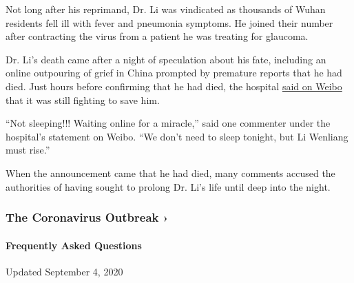 Not long after his reprimand, Dr. Li was vindicated as thousands of
Wuhan residents fell ill with fever and pneumonia symptoms. He joined
their number after contracting the virus from a patient he was treating
for glaucoma.

Dr. Li's death came after a night of speculation about his fate,
including an online outpouring of grief in China prompted by premature
reports that he had died. Just hours before confirming that he had died,
the hospital
\href{https://passport.weibo.com/visitor/visitor?entry=miniblog\&a=enter\&url=https\%3A\%2F\%2Fweibo.com\%2F2630028693\%2FIt0oliY8J\%3Ffrom\%3Dpage_1001062630028693_profile\%26wvr\%3D6\%26mod\%3Dweibotime\&domain=.weibo.com\&ua=php-sso_sdk_client-0.6.28\&_rand=1581029359.874}{said
on Weibo} that it was still fighting to save him.

``Not sleeping!!! Waiting online for a miracle,'' said one commenter
under the hospital's statement on Weibo. ``We don't need to sleep
tonight, but Li Wenliang must rise.''

When the announcement came that he had died, many comments accused the
authorities of having sought to prolong Dr. Li's life until deep into
the night.

\href{https://www.nytimes3xbfgragh.onion/news-event/coronavirus?action=click\&pgtype=Article\&state=default\&region=MAIN_CONTENT_3\&context=storylines_faq}{}

\hypertarget{the-coronavirus-outbreak-}{%
\subsubsection{The Coronavirus Outbreak
›}\label{the-coronavirus-outbreak-}}

\hypertarget{frequently-asked-questions}{%
\paragraph{Frequently Asked
Questions}\label{frequently-asked-questions}}

Updated September 4, 2020

